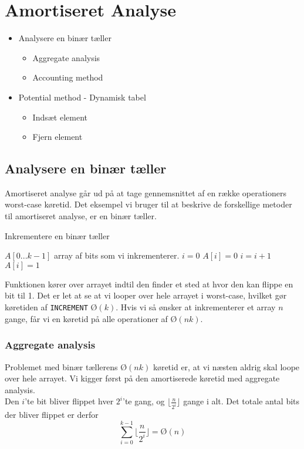 
\section{Amortiseret Analyse}
\hrulefill
\begin{itemize}
\item Analysere en binær tæller
\begin{itemize}
    \item Aggregate analysis
    \item Accounting method
\end{itemize}
\item Potential method - Dynamisk tabel
  \begin{itemize}
  \item Indsæt element
  \item Fjern element
  \end{itemize}
\end{itemize}

\newpage
\subsection{Analysere en binær tæller}
Amortiseret analyse går ud på at tage gennemsnittet af en række operationers worst-case køretid. Det eksempel vi bruger til at beskrive de forskellige metoder til amortiseret analyse, er en binær tæller.\\

\begin{algorithm}[H]
  \caption{Inkrementere en binær tæller}
  \begin{algorithmic}[1]
  \State $A[0...k-1]$ array af bits som vi inkrementerer.
  \State $i = 0$
  \State $A[i] = 0$
  \State $i = i + 1$
  \EndWhile
  \State $A[i] = 1$
  \EndIf
  \EndFunction
  \end{algorithmic}
\end{algorithm}

Funktionen kører over arrayet indtil den finder et sted at hvor den kan flippe en bit til 1. Det er let at se at vi looper over hele arrayet i worst-case, hvilket gør køretiden af \texttt{INCREMENT} $Ø(k)$. Hvis vi så ønsker at inkrementerer et array $n$ gange, får vi en køretid på alle operationer af $Ø(nk)$.

\subsubsection{Aggregate analysis}
Problemet med binær tællerens $Ø(nk)$ køretid er, at vi næsten aldrig skal loope over hele arrayet. Vi kigger først på den amortiserede køretid med aggregate analysis.\\
Den $i$'te bit bliver flippet hver $2^i$'te gang, og $\lfloor \frac{n}{2^i}\rfloor$ gange i alt. Det totale antal bits der bliver flippet er derfor 
$$\sum_{i=0}^{k-1} \lfloor \frac{n}{2^i}\rfloor = Ø(n)$$

